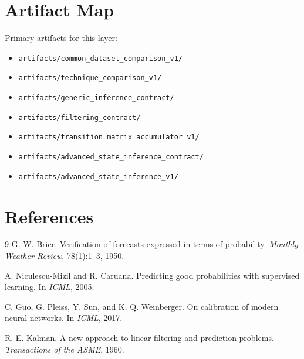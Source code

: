 \documentclass[11pt]{article}
\begin{document}
\section{Artifact Map}

Primary artifacts for this layer:
\begin{itemize}[leftmargin=1.5em]
    \item \texttt{artifacts/common\_dataset\_comparison\_v1/}
    \item \texttt{artifacts/technique\_comparison\_v1/}
    \item \texttt{artifacts/generic\_inference\_contract/}
    \item \texttt{artifacts/filtering\_contract/}
    \item \texttt{artifacts/transition\_matrix\_accumulator\_v1/}
    \item \texttt{artifacts/advanced\_state\_inference\_contract/}
    \item \texttt{artifacts/advanced\_state\_inference\_v1/}
\end{itemize}

\section{References}
\begin{thebibliography}{9}
G. W. Brier.
\newblock Verification of forecasts expressed in terms of probability.
\newblock \emph{Monthly Weather Review}, 78(1):1--3, 1950.

A. Niculescu-Mizil and R. Caruana.
\newblock Predicting good probabilities with supervised learning.
\newblock In \emph{ICML}, 2005.

C. Guo, G. Pleiss, Y. Sun, and K. Q. Weinberger.
\newblock On calibration of modern neural networks.
\newblock In \emph{ICML}, 2017.

R. E. Kalman.
\newblock A new approach to linear filtering and prediction problems.
\newblock \emph{Transactions of the ASME}, 1960.
\end{thebibliography}
\end{document}
